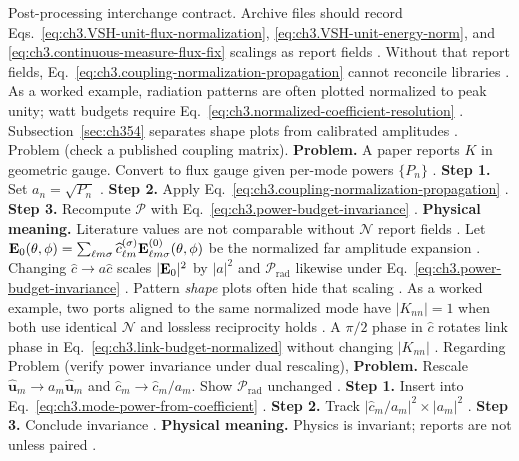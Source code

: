 Post-processing interchange contract. Archive files should record Eqs.~\eqref{eq:ch3.VSH-unit-flux-normalization}, \eqref{eq:ch3.VSH-unit-energy-norm},
and \eqref{eq:ch3.continuous-measure-flux-fix} scalings as report fields \cite{harrington2001}. Without that
report fields, Eq.~\eqref{eq:ch3.coupling-normalization-propagation} cannot reconcile libraries \cite{harrington2001}.
As a worked example, radiation patterns are often plotted normalized to peak unity; watt budgets require
Eq.~\eqref{eq:ch3.normalized-coefficient-resolution} \cite{stratton1941}. Subsection~\ref{sec:ch354}
separates shape plots from calibrated amplitudes \cite{harrington2001}.
Problem (check a published coupling matrix). \textbf{Problem.} A paper reports \(K\) in geometric gauge. Convert to flux gauge given per-mode powers \(\{P_{n}\}\)
\cite{harrington2001}.
\textbf{Step 1.} Set \(a_{n}=\sqrt{P_{n}}\) \cite{poynting1884}.
\textbf{Step 2.} Apply Eq.~\eqref{eq:ch3.coupling-normalization-propagation} \cite{hansen1988}.
\textbf{Step 3.} Recompute \(\mathcal{P}\) with Eq.~\eqref{eq:ch3.power-budget-invariance} \cite{harrington2001}.
\textbf{Physical meaning.} Literature values are not comparable without \(\mathcal{N}\) report fields \cite{stratton1941}.
Let \(\mathbf{E}_{0}(\theta,\phi)=\sum_{\ell m\sigma}\widehat{c}_{\ell m}^{(\sigma)}\mathbf{E}_{\ell m\sigma}^{(0)}(\theta,\phi)\) be the
normalized far amplitude expansion \cite{stratton1941}. Changing \(\widehat{c}\to a\widehat{c}\) scales
\(|\mathbf{E}_{0}|^{2}\) by \(|a|^{2}\) and \(\mathcal{P}_{\mathrm{rad}}\) likewise under Eq.~\eqref{eq:ch3.power-budget-invariance}
\cite{poynting1884}. Pattern \emph{shape} plots often hide that scaling \cite{harrington2001}.
As a worked example, two ports aligned to the same normalized mode have \(|K_{nn}|=1\) when both use identical \(\mathcal{N}\) and lossless
reciprocity holds \cite{stratton1941}. A \(\pi/2\) phase in \(\widehat{c}\) rotates link phase in
Eq.~\eqref{eq:ch3.link-budget-normalized} without changing \(|K_{nn}|\) \cite{hansen1988}.
Regarding Problem (verify power invariance under dual rescaling), \textbf{Problem.} Rescale \(\widehat{\mathbf{u}}_{m}\to a_{m}\widehat{\mathbf{u}}_{m}\) and \(\widehat{c}_{m}\to\widehat{c}_{m}/a_{m}\).
Show \(\mathcal{P}_{\mathrm{rad}}\) unchanged \cite{harrington2001}.
\textbf{Step 1.} Insert into Eq.~\eqref{eq:ch3.mode-power-from-coefficient} \cite{poynting1884}.
\textbf{Step 2.} Track \(| \widehat{c}_{m}/a_{m}|^{2}\times|a_{m}|^{2}\) \cite{hansen1988}.
\textbf{Step 3.} Conclude invariance \cite{stratton1941}.
\textbf{Physical meaning.} Physics is invariant; reports are not unless paired \cite{harrington2001}.
